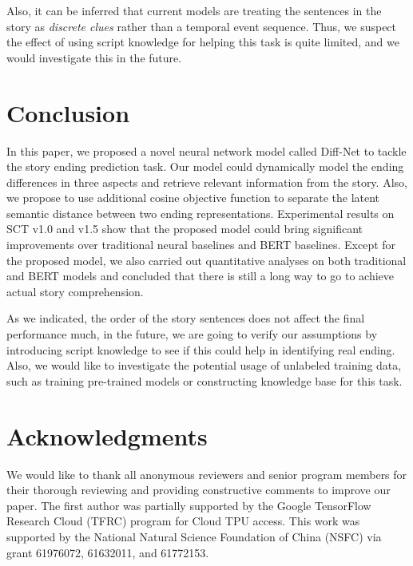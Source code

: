 \documentclass[letterpaper]{article} %
\begin{document}
Also, it can be inferred that current models are treating the sentences in the story as {\em discrete clues} rather than a temporal event sequence. Thus, we suspect the effect of using script knowledge for helping this task is quite limited, and we would investigate this in the future.



\vspace{-0.96mm}
\vspace{-2.41mm}
\section{Conclusion}\label{conclusion}
In this paper, we proposed a novel neural network model called Diff-Net to tackle the story ending prediction task.
Our model could dynamically model the ending differences in three aspects and retrieve relevant information from the story.
Also, we propose to use additional cosine objective function to separate the latent semantic distance between two ending representations.
Experimental results on SCT v1.0 and v1.5 show that the proposed model could bring significant improvements over traditional neural baselines and BERT baselines.
Except for the proposed model, we also carried out quantitative analyses on both traditional and BERT models and concluded that there is still a long way to go to achieve actual story comprehension.

As we indicated, the order of the story sentences does not affect the final performance much, in the future, we are going to verify our assumptions by introducing script knowledge to see if this could help in identifying real ending.
Also, we would like to investigate the potential usage of unlabeled training data, such as training pre-trained models or constructing knowledge base for this task.


\vspace{-1.76mm}
\section{Acknowledgments}\label{ack}
We would like to thank all anonymous reviewers and senior program members for their thorough reviewing and providing constructive comments to improve our paper.
The first author was partially supported by the Google TensorFlow Research Cloud (TFRC) program for Cloud TPU access.
This work was supported by the National Natural Science Foundation of China (NSFC) via grant 61976072, 61632011, and 61772153.
\end{document}
